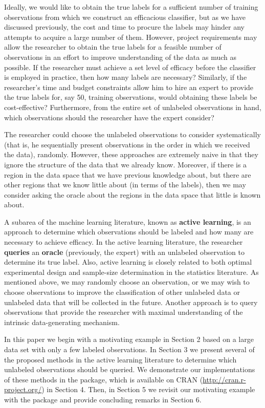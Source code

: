 \documentclass[article]{jss}
\begin{document}
Ideally, we would like to obtain the true labels for a sufficient number of training observations from which we construct an efficacious classifier, but as we have discussed previously, the cost and time to procure the labels may hinder any attempts to acquire a large number of them. However, project requirements may allow the researcher to obtain the true labels for a feasible number of observations in an effort to improve understanding of the data as much as possible. If the researcher must achieve a set level of efficacy before the classifier is employed in practice, then how many labels are necessary? Similarly, if the researcher's time and budget constraints allow him to hire an expert to provide the true labels for, say 50, training observations, would obtaining these labels be cost-effective? Furthermore, from the entire set of unlabeled observations in hand, which observations should the researcher have the expert consider?

The researcher could choose the unlabeled observations to consider systematically (that is, he sequentially present observations in the order in which we received the data), randomly. However, these approaches are extremely naive in that they ignore the structure of the data that we already know. Moreover, if there is a region in the data space that we have previous knowledge about, but there are other regions that we know little about (in terms of the labels), then we may consider asking the oracle about the regions in the data space that little is known about.

A subarea of the machine learning literature, known as \textbf{active learning}, is an approach to determine which observations should be labeled and how many are necessary to achieve efficacy. In the active learning literature, the researcher \textbf{queries} an \textbf{oracle} (previously, the expert) with an unlabeled observation to determine its true label. Also, active learning is closely related to both optimal experimental design and sample-size determination in the statistics literature. As mentioned above, we may randomly choose an observation, or we may wish to choose observations to improve the classification of other unlabeled data or unlabeled data that will be collected in the future. Another approach is to query observations that provide the researcher with maximal understanding of the intrinsic data-generating mechanism.

In this paper we begin with a motivating example in Section 2 based on a large data set with only a few labeled observations. In Section 3 we present several of the proposed methods in the active learning literature to determine which unlabeled observations should be queried. We demonstrate our implementations of these methods in the  package, which is available on CRAN (\url{http://cran.r-project.org/}) in Section 4. Then, in Section 5 we revisit our motivating example with the  package and provide concluding remarks in Section 6.
\end{document}
